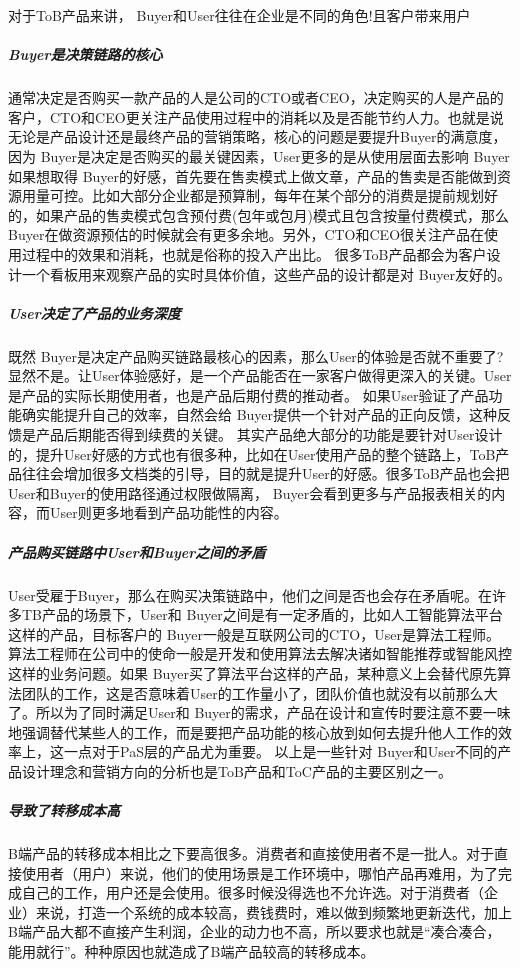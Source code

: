 \documentclass[letterpaper,10pt,english]{sphinxmanual}
\begin{document}
对于ToB产品来讲， Buyer和User往往在企业是不同的角色!且客户带来用户


\subparagraph{Buyer是决策链路的核心}
\label{\detokenize{chapter_introduction/2B:buyer}}
通常决定是否购买一款产品的人是公司的CTO或者CEO，决定购买的人是产品的客户，CTO和CEO更关注产品使用过程中的消耗以及是否能节约人力。也就是说无论是产品设计还是最终产品的营销策略，核心的问题是要提升Buyer的满意度，因为
Buyer是决定是否购买的最关键因素，User更多的是从使用层面去影响
Buyer如果想取得
Buyer的好感，首先要在售卖模式上做文章，产品的售卖是否能做到资源用量可控。比如大部分企业都是预算制，每年在某个部分的消费是提前规划好的，如果产品的售卖模式包含预付费(包年或包月)模式且包含按量付费模式，那么
Buyer在做资源预估的时候就会有更多余地。另外，CTO和CEO很关注产品在使用过程中的效果和消耗，也就是俗称的投入产出比。
很多ToB产品都会为客户设计一个看板用来观察产品的实时具体价值，这些产品的设计都是对
Buyer友好的。


\subparagraph{User决定了产品的业务深度}
\label{\detokenize{chapter_introduction/2B:user}}
既然
Buyer是决定产品购买链路最核心的因素，那么User的体验是否就不重要了?显然不是。让User体验感好，是一个产品能否在一家客户做得更深入的关键。User是产品的实际长期使用者，也是产品后期付费的推动者。
如果User验证了产品功能确实能提升自己的效率，自然会给
Buyer提供一个针对产品的正向反馈，这种反馈是产品后期能否得到续费的关键。
其实产品绝大部分的功能是要针对User设计的，提升User好感的方式也有很多种，比如在User使用产品的整个链路上，ToB产品往往会增加很多文档类的引导，目的就是提升User的好感。很多ToB产品也会把User和Buyer的使用路径通过权限做隔离，
Buyer会看到更多与产品报表相关的内容，而User则更多地看到产品功能性的内容。


\subparagraph{产品购买链路中User和Buyer之间的矛盾}
\label{\detokenize{chapter_introduction/2B:userbuyer}}
User受雇于Buyer，那么在购买决策链路中，他们之间是否也会存在矛盾呢。在许多TB产品的场景下，User和
Buyer之间是有一定矛盾的，比如人工智能算法平台这样的产品，目标客户的
Buyer一般是互联网公司的CTO，User是算法工程师。算法工程师在公司中的使命一般是开发和使用算法去解决诸如智能推荐或智能风控这样的业务问题。如果
Buyer买了算法平台这样的产品，某种意义上会替代原先算法团队的工作，这是否意味着User的工作量小了，团队价值也就没有以前那么大了。所以为了同时满足User和
Buyer的需求，产品在设计和宣传时要注意不要一味地强调替代某些人的工作，而是要把产品功能的核心放到如何去提升他人工作的效率上，这一点对于PaS层的产品尤为重要。
以上是一些针对
Buyer和User不同的产品设计理念和营销方向的分析也是ToB产品和ToC产品的主要区别之一。


\subparagraph{导致了转移成本高}
\label{\detokenize{chapter_introduction/2B:id29}}
B端产品的转移成本相比之下要高很多。消费者和直接使用者不是一批人。对于直接使用者（用户）来说，他们的使用场景是工作环境中，哪怕产品再难用，为了完成自己的工作，用户还是会使用。很多时候没得选也不允许选。对于消费者（企业）来说，打造一个系统的成本较高，费钱费时，难以做到频繁地更新迭代，加上B端产品大都不直接产生利润，企业的动力也不高，所以要求也就是“凑合凑合，能用就行”。种种原因也就造成了B端产品较高的转移成本。%
\begin{footnote}[87]\sphinxAtStartFootnote
{}
%
\end{footnote}
\end{document}
